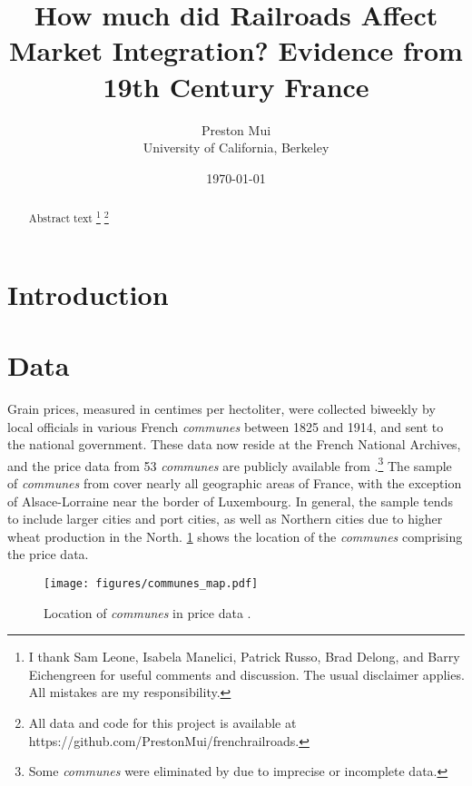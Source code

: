 \documentclass[12pt,twoside]{article}
\title{How much did Railroads Affect Market Integration? Evidence from 19th Century France}
\date{\today}
\author{Preston Mui \\ University of California, Berkeley}
\begin{document}
\maketitle

\begin{abstract}
   Abstract text
   \footnote{I thank Sam Leone, Isabela Manelici, Patrick Russo, Brad Delong, and Barry Eichengreen for useful comments and discussion. The usual disclaimer applies. All mistakes are my responsibility.}
   \footnote{All data and code for this project is available at https://github.com/PrestonMui/frenchrailroads.}
\end{abstract}

\newpage
\section{Introduction}

\section{Data}


Grain prices, measured in centimes per hectoliter, were collected biweekly by local officials in various French \emph{communes} between 1825 and 1914, and sent to the national government.
These data now reside at the French National Archives, and the price data from 53 \emph{communes} are publicly available from \cite{prices}.\footnote{Some \emph{communes} were eliminated by \cite{prices} due to imprecise or incomplete data.}
The sample of \emph{communes} from \cite{prices} cover nearly all geographic areas of France, with the exception of Alsace-Lorraine near the border of Luxembourg.
In general, the sample tends to include larger cities and port cities, as well as Northern cities due to higher wheat production in the North.
\ref{fig:communes_map} shows the location of the \emph{communes} comprising the price data.

\begin{figure}[h]
	\centering
	\texttt{[image: figures/communes\_map.pdf]}
	\caption{Location of \emph{communes} in price data \citep{prices}.}
	\label{fig:communes_map}
\end{figure}

\end{document}

